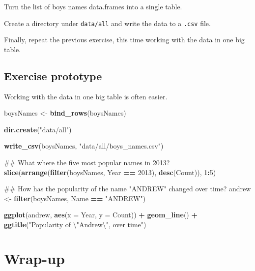 \documentclass[]{book}
\newenvironment{Shaded}{\begin{snugshade}}{\end{snugshade}}
\newcommand{\KeywordTok}[1]{\textcolor[rgb]{0.13,0.29,0.53}{\textbf{#1}}}
\newcommand{\DataTypeTok}[1]{\textcolor[rgb]{0.13,0.29,0.53}{#1}}
\newcommand{\DecValTok}[1]{\textcolor[rgb]{0.00,0.00,0.81}{#1}}
\newcommand{\CharTok}[1]{\textcolor[rgb]{0.31,0.60,0.02}{#1}}
\newcommand{\StringTok}[1]{\textcolor[rgb]{0.31,0.60,0.02}{#1}}
\newcommand{\OperatorTok}[1]{\textcolor[rgb]{0.81,0.36,0.00}{\textbf{#1}}}
\newcommand{\NormalTok}[1]{#1}
\begin{document}
Turn the list of boys names data.frames into a single table.

Create a directory under \texttt{data/all} and write the data to a
\texttt{.csv} file.

Finally, repeat the previous exercise, this time working with the data
in one big table.

\subsection{Exercise prototype}\label{exercise-prototype-1}

Working with the data in one big table is often easier.

\begin{Shaded}
\begin{Highlighting}[]
\NormalTok{boysNames <-}\StringTok{ }\KeywordTok{bind_rows}\NormalTok{(boysNames)}

\KeywordTok{dir.create}\NormalTok{(}\StringTok{"data/all"}\NormalTok{)}

\KeywordTok{write_csv}\NormalTok{(boysNames, }\StringTok{"data/all/boys_names.csv"}\NormalTok{)}

\NormalTok{## What where the five most popular names in 2013?}
\KeywordTok{slice}\NormalTok{(}\KeywordTok{arrange}\NormalTok{(}\KeywordTok{filter}\NormalTok{(boysNames, Year }\OperatorTok{==}\StringTok{ }\DecValTok{2013}\NormalTok{),}
              \KeywordTok{desc}\NormalTok{(Count)),}
      \DecValTok{1}\OperatorTok{:}\DecValTok{5}\NormalTok{)}

\NormalTok{## How has the popularity of the name "ANDREW" changed over time?}
\NormalTok{andrew <-}\StringTok{ }\KeywordTok{filter}\NormalTok{(boysNames, Name }\OperatorTok{==}\StringTok{ "ANDREW"}\NormalTok{)}

\KeywordTok{ggplot}\NormalTok{(andrew, }\KeywordTok{aes}\NormalTok{(}\DataTypeTok{x =}\NormalTok{ Year, }\DataTypeTok{y =}\NormalTok{ Count)) }\OperatorTok{+}
\StringTok{    }\KeywordTok{geom_line}\NormalTok{() }\OperatorTok{+}
\StringTok{    }\KeywordTok{ggtitle}\NormalTok{(}\StringTok{"Popularity of }\CharTok{\textbackslash{}"}\StringTok{Andrew}\CharTok{\textbackslash{}"}\StringTok{, over time"}\NormalTok{)}
\end{Highlighting}
\end{Shaded}

\section{Wrap-up}\label{wrap-up-3}
\end{document}
